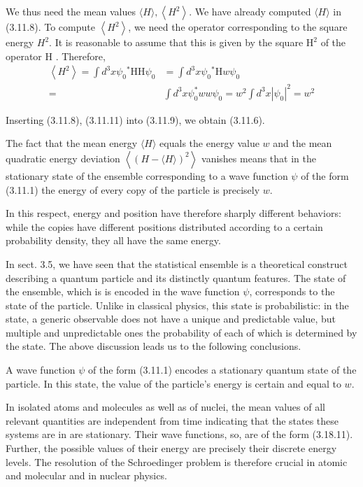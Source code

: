\documentclass{article}
\begin{document}
We thus need the mean values $\langle H\rangle,\left\langle H^{2}\right\rangle$. We have already computed $\langle H\rangle$ in (3.11.8). To compute $\left\langle H^{2}\right\rangle$, we need the operator corresponding to the square energy $H^{2}$. It is reasonable to assume that this is given by the square $\mathrm{H}^{2}$ of the operator H . Therefore,
$$
\begin{align*}
\left\langle H^{2}\right\rangle=\int d^{3} x \psi_{0}{ }^{*} \mathrm{HH} \psi_{0} & =\int d^{3} x \psi_{0}{ }^{*} \mathrm{H} w \psi_{0}  \tag{3.11.11}\\
= & \int d^{3} x \psi_{0}^{*} w w \psi_{0}=w^{2} \int d^{3} x\left|\psi_{0}\right|^{2}=w^{2}
\end{align*}
$$

Inserting (3.11.8), (3.11.11) into (3.11.9), we obtain (3.11.6).

The fact that the mean energy $\langle H\rangle$ equals the energy value $w$ and the mean quadratic energy deviation $\left\langle(H-\langle H\rangle)^{2}\right\rangle$ vanishes means that
in the stationary state of the ensemble corresponding to a wave function $\psi$ of the form (3.11.1) the energy of every copy of the particle is precisely $w$.

In this respect, energy and position have therefore sharply different behaviors: while the copies have different positions distributed according to a certain probability density, they all have the same energy.

In sect. 3.5, we have seen that the statistical ensemble is a theoretical construct describing a quantum particle and its distinctly quantum features. The state of the ensemble, which is is encoded in the wave function $\psi$, corresponds to the state of the particle. Unlike in classical physics, this state is probabilistic: in the state, a generic observable does not have a unique and predictable value, but multiple and unpredictable ones the probability of each of which is determined by the state. The above discussion leads us to the following conclusions.

A wave function $\psi$ of the form (3.11.1) encodes a stationary quantum state of the particle. In this state, the value of the particle's energy is certain and equal to $w$.

In isolated atoms and molecules as well as of nuclei, the mean values of all relevant quantities are independent from time indicating that the states these systems are in are stationary. Their wave functions, so, are of the form (3.18.11). Further, the possible values of their energy are precisely their discrete energy levels. The resolution of the Schroedinger problem is therefore crucial in atomic and molecular and in nuclear physics.
\end{document}
